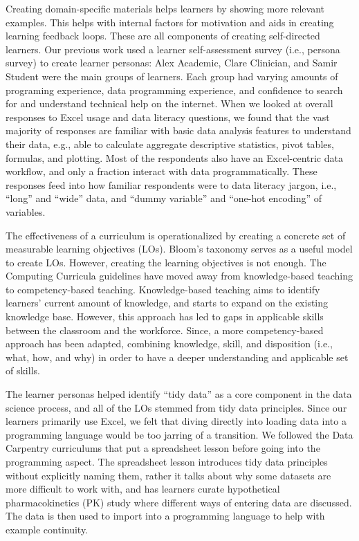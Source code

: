 \documentclass[030-workshop.tex]{subfiles}
\begin{document}
    Creating domain-specific materials helps learners by showing more relevant examples.
    This helps with internal factors for motivation and aids in creating learning feedback loops.
    These are all components of creating self-directed learners.
    Our previous work used a learner self-assessment survey (i.e., persona survey) to create learner personas:
    Alex Academic, Clare Clinician, and Samir Student were the main groups of learners.
    Each group had varying amounts of
    programing experience, data programming experience, and
    confidence to search for and understand technical help on the internet.
    When we looked at overall responses to Excel usage and data literacy questions,
    we found that the vast majority of responses are familiar with basic data analysis features to understand their data,
    e.g., able to calculate aggregate descriptive statistics,
    pivot tables,
    formulas,
    and plotting. %
    Most of the respondents also have an Excel-centric data workflow,
    and only a fraction interact with data programmatically. %
    These responses feed into how familiar respondents were to data literacy jargon, i.e., ``long'' and ``wide'' data,
    and ``dummy variable'' and ``one-hot encoding'' of variables.

    The effectiveness of a curriculum is operationalized by creating a concrete set of
    measurable learning objectives (LOs).
    Bloom's taxonomy serves as a useful model to create LOs.
    However, creating the learning objectives is not enough.
    The Computing Curricula guidelines have moved away from knowledge-based teaching to competency-based teaching.
    Knowledge-based teaching aims to identify learners' current amount of knowledge,
    and starts to expand on the existing knowledge base.
    However, this approach has led to gaps in applicable skills between the classroom and the workforce.
    Since, a more competency-based approach has been adapted,
    combining knowledge, skill, and disposition (i.e., what, how, and why) in order
    to have a deeper understanding and applicable set of skills.

    The learner personas helped identify ``tidy data'' as a core component in the data science process,
    and all of the LOs stemmed from tidy data principles.
    Since our learners primarily use Excel,
    we felt that diving directly into loading data into a programming language would be too jarring of a transition.
    We followed the Data Carpentry curriculums that put a spreadsheet lesson before going into the programming aspect.
    The spreadsheet lesson introduces tidy data principles without explicitly naming them,
    rather it talks about why some datasets are more difficult to work with,
    and has learners curate hypothetical pharmacokinetics (PK) study where different ways of entering data are discussed.
    The data is then used to import into a programming language to help with example continuity.
\end{document}
